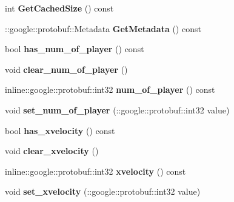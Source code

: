 \begin{DoxyCompactItemize}
\item 
\hypertarget{class_control_player_a286ce6080af5efae2c5769d8904a0d9a}{int {\bfseries Get\-Cached\-Size} () const }\label{class_control_player_a286ce6080af5efae2c5769d8904a0d9a}

\item 
\hypertarget{class_control_player_a6b3b68636b9e666518c5b8c6411bc6cb}{\-::google\-::protobuf\-::\-Metadata {\bfseries Get\-Metadata} () const }\label{class_control_player_a6b3b68636b9e666518c5b8c6411bc6cb}

\item 
\hypertarget{class_control_player_ad9ba495fb6558cb8bcd24be096cbdefa}{bool {\bfseries has\-\_\-num\-\_\-of\-\_\-player} () const }\label{class_control_player_ad9ba495fb6558cb8bcd24be096cbdefa}

\item 
\hypertarget{class_control_player_a24c464ffc2da4acaae33a52e31a1f053}{void {\bfseries clear\-\_\-num\-\_\-of\-\_\-player} ()}\label{class_control_player_a24c464ffc2da4acaae33a52e31a1f053}

\item 
\hypertarget{class_control_player_ac2838f802a27d8c3cde6aae50aa1beb1}{inline\-::google\-::protobuf\-::int32 {\bfseries num\-\_\-of\-\_\-player} () const }\label{class_control_player_ac2838f802a27d8c3cde6aae50aa1beb1}

\item 
\hypertarget{class_control_player_ac6572d26fc4233c40b9194c16fd9a7b4}{void {\bfseries set\-\_\-num\-\_\-of\-\_\-player} (\-::google\-::protobuf\-::int32 value)}\label{class_control_player_ac6572d26fc4233c40b9194c16fd9a7b4}

\item 
\hypertarget{class_control_player_a7b7924fb3150a0185246e9586715f69e}{bool {\bfseries has\-\_\-xvelocity} () const }\label{class_control_player_a7b7924fb3150a0185246e9586715f69e}

\item 
\hypertarget{class_control_player_afb00a137d204116ef3e2ad739e1784e1}{void {\bfseries clear\-\_\-xvelocity} ()}\label{class_control_player_afb00a137d204116ef3e2ad739e1784e1}

\item 
\hypertarget{class_control_player_aa4ae47b09a2afa53a42520d676509af9}{inline\-::google\-::protobuf\-::int32 {\bfseries xvelocity} () const }\label{class_control_player_aa4ae47b09a2afa53a42520d676509af9}

\item 
\hypertarget{class_control_player_a4ad42d15731a8d10bd818631268a0c34}{void {\bfseries set\-\_\-xvelocity} (\-::google\-::protobuf\-::int32 value)}\label{class_control_player_a4ad42d15731a8d10bd818631268a0c34}


\end{DoxyCompactItemize}
